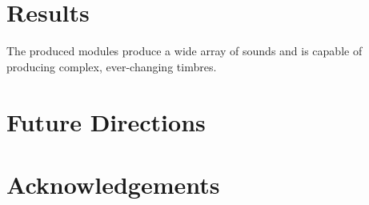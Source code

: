 \documentclass[10pt]{article}
\begin{document}
\section{Results}
The produced modules produce a wide array of sounds and is capable of producing complex, ever-changing timbres. 

\section{Future Directions}


\section{Acknowledgements}

\pagebreak


\end{document}
